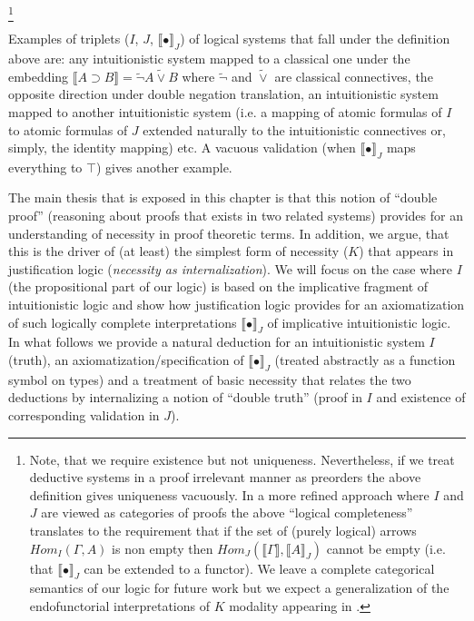 \footnote{Note, that we require existence but not uniqueness. Nevertheless, if we treat deductive systems  in a proof irrelevant manner as preorders 
the above definition gives uniqueness vacuously. In a more refined approach where $I$ and $J$ are viewed as  categories of proofs  the above ``logical completeness''  
translates to the requirement that if the set of (purely logical) arrows $Hom_I(\Gamma,A)$ is non empty  then $Hom_J(\llbracket\Gamma\rrbracket,\llbracket A\rrbracket_J)$ 
cannot be empty (i.e. that $\llbracket\bullet \rrbracket_J$ can be extended to a functor). We leave a complete categorical semantics of our logic 
for future work but we expect   a generalization of the 
endofunctorial interpretations of $K$ modality appearing in \cite{Bellin2001,kavvos2016system}.} 


Examples of triplets ($I$, $J$, $\llbracket\bullet \rrbracket_J$) of logical systems that fall under the definition above are: any intuitionistic system mapped 
to a classical one under the embedding $\llbracket A \supset B\rrbracket= \tilde{\neg} A \tilde{\vee} B$ where  $\tilde{\neg}$
and $\tilde{\vee}$ are classical connectives, the opposite direction under double negation translation, 
an  intuitionistic system  mapped to another intuitionistic system (i.e. a mapping of atomic formulas of $I$ to atomic formulas of $J$ extended naturally to the intuitionistic connectives 
or, simply, the identity mapping) etc.  A vacuous validation  (when $\llbracket\bullet  \rrbracket_J$ maps everything to $\top$) gives another example. 

The main thesis that is exposed in this chapter is that this notion of ``double proof'' (reasoning about proofs that exists in two related systems) 
provides for an understanding of necessity in proof theoretic terms. In addition, we argue, 
that this is the driver of (at least) the simplest
form of necessity ($K$) that appears in justification logic (\textit{necessity as internalization}).
We will focus on the case where $I$ (the propositional part of our logic) is based on the implicative fragment of intuitionistic logic and show how justification logic
provides for an axiomatization of such logically complete interpretations $\llbracket\bullet\rrbracket_J$ of  implicative intuitionistic logic.
In what follows we provide  a natural deduction for
an intuitionistic system $I$ (truth), an axiomatization/specification of   $\llbracket \bullet \rrbracket_J$ (treated abstractly as a function symbol on types) and a treatment 
of basic necessity that relates the two deductions by internalizing  a  notion of ``double truth'' (proof in $I$  and  existence of corresponding validation in  $J$).
